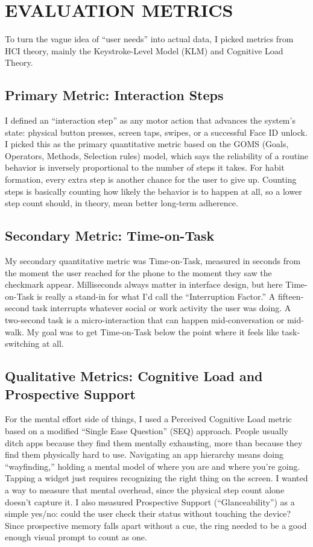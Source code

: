 \documentclass[10pt,twocolumn]{article}
\begin{document}
\section{EVALUATION METRICS}

To turn the vague idea of ``user needs'' into actual data, I picked metrics from HCI theory, mainly the Keystroke-Level Model (KLM) and Cognitive Load Theory.\cite{CardKeystrokeModel}

\subsection{Primary Metric: Interaction Steps}

I defined an ``interaction step'' as any motor action that advances the system's state: physical button presses, screen taps, swipes, or a successful Face ID unlock. I picked this as the primary quantitative metric based on the GOMS (Goals, Operators, Methods, Selection rules) model, which says the reliability of a routine behavior is inversely proportional to the number of steps it takes. For habit formation, every extra step is another chance for the user to give up. Counting steps is basically counting how likely the behavior is to happen at all, so a lower step count should, in theory, mean better long-term adherence.

\subsection{Secondary Metric: Time-on-Task}

My secondary quantitative metric was Time-on-Task, measured in seconds from the moment the user reached for the phone to the moment they saw the checkmark appear. Milliseconds always matter in interface design, but here Time-on-Task is really a stand-in for what I'd call the ``Interruption Factor.'' A fifteen-second task interrupts whatever social or work activity the user was doing. A two-second task is a micro-interaction that can happen mid-conversation or mid-walk. My goal was to get Time-on-Task below the point where it feels like task-switching at all.

\subsection{Qualitative Metrics: Cognitive Load and Prospective Support}

For the mental effort side of things, I used a Perceived Cognitive Load metric based on a modified ``Single Ease Question'' (SEQ) approach. People usually ditch apps because they find them mentally exhausting, more than because they find them physically hard to use.\cite{AppleHIGWidgets} Navigating an app hierarchy means doing ``wayfinding,'' holding a mental model of where you are and where you're going. Tapping a widget just requires recognizing the right thing on the screen. I wanted a way to measure that mental overhead, since the physical step count alone doesn't capture it. I also measured Prospective Support (``Glanceability'') as a simple yes/no: could the user check their status without touching the device? Since prospective memory falls apart without a cue, the ring needed to be a good enough visual prompt to count as one.
\end{document}
